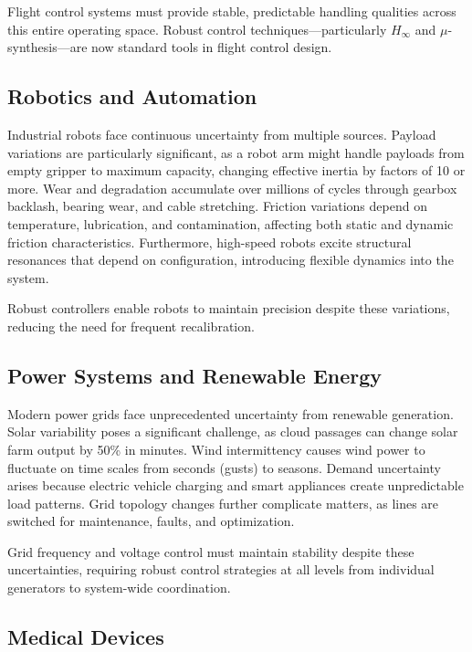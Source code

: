 Flight control systems must provide stable, predictable handling qualities across this entire operating space. Robust control techniques---particularly $H_\infty$ and $\mu$-synthesis---are now standard tools in flight control design.

\subsection{Robotics and Automation}

Industrial robots face continuous uncertainty from multiple sources. Payload variations are particularly significant, as a robot arm might handle payloads from empty gripper to maximum capacity, changing effective inertia by factors of 10 or more. Wear and degradation accumulate over millions of cycles through gearbox backlash, bearing wear, and cable stretching. Friction variations depend on temperature, lubrication, and contamination, affecting both static and dynamic friction characteristics. Furthermore, high-speed robots excite structural resonances that depend on configuration, introducing flexible dynamics into the system.

Robust controllers enable robots to maintain precision despite these variations, reducing the need for frequent recalibration.

\subsection{Power Systems and Renewable Energy}

Modern power grids face unprecedented uncertainty from renewable generation. Solar variability poses a significant challenge, as cloud passages can change solar farm output by 50\% in minutes. Wind intermittency causes wind power to fluctuate on time scales from seconds (gusts) to seasons. Demand uncertainty arises because electric vehicle charging and smart appliances create unpredictable load patterns. Grid topology changes further complicate matters, as lines are switched for maintenance, faults, and optimization.

Grid frequency and voltage control must maintain stability despite these uncertainties, requiring robust control strategies at all levels from individual generators to system-wide coordination.

\subsection{Medical Devices}

